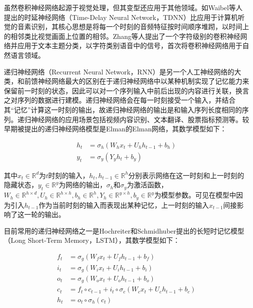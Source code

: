 虽然卷积神经网络起源于视觉处理，但其变型还应用于其他领域。如Waibel等人\cite{waibel1995phoneme}提出的时延神经网络（Time-Delay Neural Network，TDNN）比应用于计算机听觉的音素识别，其核心思想是将每一个时刻的音频特征按时间顺序堆䟙，以时间上的相邻类比视觉画面上位置的相邻。Zhang等人\cite{zhang2015character}提出了一个字符级别的卷积神经网络并应用于文本主题分类，以字符类别语音中的信号，首次将卷积神经网络用于自然语言领域。

递归神经网络（Recurrent Neural Network，RNN）是另一个人工神经网络的大类，和前馈神经网络最大的区别在于递归神经网络中以某种机制实现了记忆能力来保留前一时刻的状态，因此可以对一个序列输入中前后出现的内容进行关联，换言之对序列的数据进行建模。递归神经网络会在每一时刻接受一个输入，并结合其“记忆”计算这一时刻的输出，故递归神经网络的输出是和输入序列长度相同的序列。递归神经网络的应用场景包括视频内容识别、文本翻译、股票指标预测等。较早期被提出的递归神经网络模型是Elman\cite{elman1990finding}的Elman网络，其数学模型如下：

\begin{align}
  \label{eq:elman_rnn}
  h_t &= \sigma_h (W_h x_t + U_h h_{t-1} + b_h) \\
  y_t &= \sigma_y (Y_y h_t + b_y)
\end{align}

其中$x_t \in \mathbb{R}^d $为$t$时刻的输入，$h_t, h_{t-1} \in \mathbb{R}^h $分别表示网络在这一时刻和上一时刻的隐藏状态，$y_t \in \mathbb{R}^y$为网络的输出，$\sigma_h$和$\sigma_y$为激活函数，$W_h \in \mathbb{R}^{h \times d}, U_h \in \mathbb{R} ^ {h \times h}, b_h \in \mathbb{R}^h, Y_h \in \mathbb{R}^{y \times h}, b_y \in \mathbb{R}^y$为模型参数。可见在模型中因为引入$h_{t-1}$作为当前时刻的输入而表现出某种记忆，上一时刻的输入$x_{t-1}$间接影响了这一轮的输出。

目前常用的递归神经网络之一是Hochreiter和Schmidhuber\cite{hochreiter1997long}提出的长短时记忆模型（Long Short-Term Memory，LSTM），其数学模型如下：

\begin{align}
  \label{eq:lstm}
  f_t &= \sigma_g(W_f x_t + U_f h_{t - 1} + b_f) \\
  i_t &= \sigma_g(W_i x_t + U_i h_{t - 1} + b_i) \\
  o_t &= \sigma_g(W_o x_t + U_o h_{t - 1} + b_o) \\
  c_t &= f_t \circ c_{t-1} + i_t \circ \sigma_c (W_c x_t + U_c h_{t-1} + b_c) \\
  h_t &= o_t \circ \sigma_h (c_t)
\end{align}

